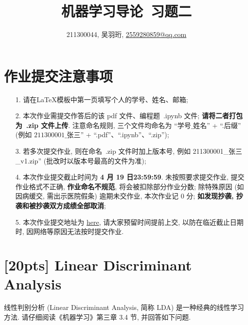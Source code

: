 \documentclass[a4paper,UTF8]{article}
\numberwithin{equation}{section}
\theoremstyle{definition}
\begin{document}
\title{机器学习导论\ 习题二}
\author{211300044, 吴羽珩, \href{mailto:邮箱}{2559280859@qq.com}}
\maketitle
\section*{作业提交注意事项}
\begin{tcolorbox}
	\begin{enumerate}
		\item[1.] 请在LaTeX模板中第一页填写个人的学号、姓名、邮箱;
		\item[2.] 本次作业需提交作答后的该 pdf 文件、编程题~.ipynb 文件; {\color{red}\textbf{请将二者打包为~.zip 文件上传}}. 注意命名规则, 三个文件均命名为 “$\text{学号}\_\text{姓名}$” + “.后缀” (例如 $\text{211300001}\_\text{张三}$” + “.pdf”、“.ipynb”、“.zip”);
		\item[3.] 若多次提交作业, 则在命名~.zip 文件时加上版本号, 例如 211300001\_张三\_v1.zip” (批改时以版本号最高的文件为准);
		\item[4.] 本次作业提交截止时间为 {\color{red}\textbf{ 4 月 19 日23:59:59}}. 未按照要求提交作业, 提交作业格式不正确, {\color{red}\textbf{作业命名不规范}}, 将会被扣除部分作业分数; 除特殊原因 (如因病缓交, 需出示医院假条) 逾期未交作业, 本次作业记 0 分; {\color{red}\textbf{如发现抄袭, 抄袭和被抄袭双方成绩全部取消}};
		\item[5.] 本次作业提交地址为 \href{https://box.nju.edu.cn/u/d/72f6f8cfff054611b6d3/}{here}, 请大家预留时间提前上交, 以防在临近截止日期时, 因网络等原因无法按时提交作业.
	\end{enumerate}
\end{tcolorbox}
\newpage


\section{[20pts] Linear Discriminant Analysis}
线性判别分析 (Linear Discriminant Analysis, 简称 LDA) 是一种经典的线性学习方法. 请仔细阅读《机器学习》第三章 3.4 节, 并回答如下问题.
\end{document}
